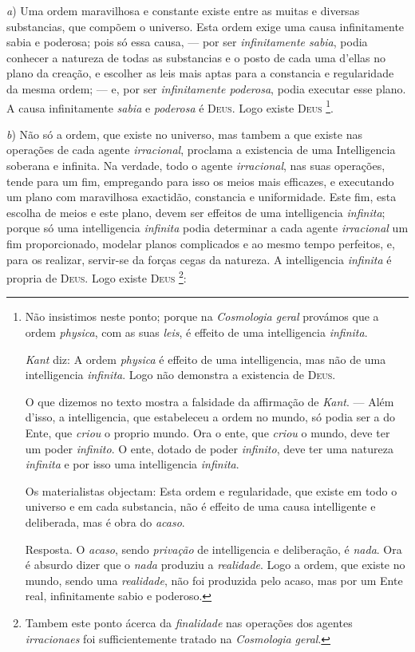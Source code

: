 \emph{a}) Uma ordem maravilhosa e constante existe entre as muitas e diversas substancias, que compõem o universo. Esta ordem exige uma causa infinitamente sabia e poderosa; pois só essa causa, --- por ser \emph{infinitamente sabia}, podia conhecer a natureza de todas as substancias e o posto de cada uma d'ellas no plano da creação, e escolher as leis mais aptas para a constancia e regularidade da mesma ordem; --- e, por ser \emph{infinitamente poderosa}, podia executar esse plano. A causa infinitamente \emph{sabia} e \emph{poderosa} é \textsc{Deus}. Logo existe \textsc{Deus} \footnote{Não insistimos neste ponto; porque na \emph{Cosmologia geral} provámos que a ordem \emph{physica}, com as suas \emph{leis}, é effeito de uma intelligencia \emph{infinita}.\par \emph{Kant} diz: A ordem \emph{physica} é effeito de uma intelligencia, mas não de uma intelligencia \emph{infinita}. Logo não demonstra a existencia de \textsc{Deus}.\par O que dizemos no texto mostra a falsidade da affirmação de \emph{Kant}. --- Além d'isso, a intelligencia, que estabeleceu a ordem no mundo, só podia ser a do Ente, que \emph{criou} o proprio mundo. Ora o ente, que \emph{criou} o mundo, deve ter um poder \emph{infinito}. O ente, dotado de poder \emph{infinito}, deve ter uma natureza \emph{infinita} e por isso uma intelligencia \emph{infinita}.\par Os materialistas objectam: Esta ordem e regularidade, que existe em todo o universo e em cada substancia, não é effeito de uma causa intelligente e deliberada, mas é obra do \emph{acaso}.\par Resposta. O \emph{acaso}, sendo \emph{privação} de intelligencia e deliberação, é \emph{nada}. Ora é absurdo dizer que o \emph{nada} produziu a \emph{realidade}. Logo a ordem, que existe no mundo, sendo uma \emph{realidade}, não foi produzida pelo acaso, mas por um Ente real, infinitamente sabio e poderoso.}.

\emph{b}) Não só a ordem, que existe no universo, mas tambem a que existe nas operações de cada agente \emph{irracional}, proclama  a existencia de uma Intelligencia soberana e infinita. Na verdade, todo o agente \emph{irracional}, nas suas operações, tende para um fim, empregando para isso os meios mais efficazes, e executando um plano com maravilhosa exactidão, constancia e uniformidade. Este fim, esta escolha de meios e este plano, devem ser effeitos de uma intelligencia \emph{infinita}; porque só uma intelligencia \emph{infinita} podia determinar a cada agente \emph{irracional} um fim proporcionado, modelar planos complicados e ao mesmo tempo perfeitos, e, para os realizar, servir-se da forças cegas da natureza. A intelligencia \emph{infinita} é propria de \textsc{Deus}. Logo existe \textsc{Deus} \footnote{Tambem este ponto ácerca da \emph{finalidade} nas operações dos agentes \emph{irracionaes} foi sufficientemente tratado na \emph{Cosmologia geral}.}:

